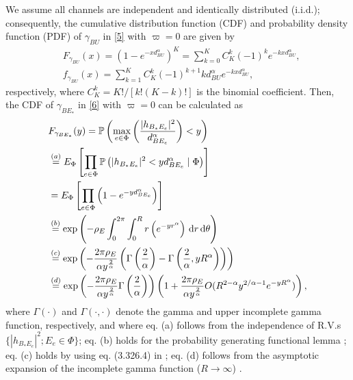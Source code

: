 \documentclass[10pt]{IEEEtran}
\newcommand{\rmd}{\,{\rm d}}
\begin{document}
We assume all channels are independent and identically distributed (i.i.d.); consequently, the cumulative distribution function (CDF) and probability density function (PDF) of $\gamma_{BU}$ in \eqref{5} with $\varpi = 0$ are given by
\begin{equation}\label{8}
\begin{split}
&F_{\gamma_{BU}}(x) = \left(1-e^{-xd^\alpha_{BU}}\right)^K = \sum^K_{k=0}C^k_K(-1)^ke^{-kxd^\alpha_{BU}},\\
&f_{\gamma_{BU}}(x) = \sum_{k=1}^KC^k_K(-1)^{k+1}kd^\alpha_{BU} e^{-kxd^\alpha_{BU}},
\end{split}
\end{equation}
respectively, where $C^{k}_{K}=K!/[k!(K-k)!]$ is the binomial coefficient. Then, the CDF of $\gamma_{BE_*}$ in \eqref{6} with $\varpi = 0$ can be calculated as
\begin{equation} \label{9}
\begin{split}
&F_{\gamma_{BE_*}}(y) = \mathbb{P}\left(\underset{e\in \Phi}{\max}\left(\frac{|h_{B_*E_e}|^2}{d^\alpha_{BE_e}}\right)<y\right)\\
& \overset{(a)}{=}  E_\Phi\left[\prod_{e\in \Phi}\mathbb{P}\left(|h_{B_*E_e}|^2<yd^{\alpha}_{BE_e}\mid \Phi\right)\right]\\
& =  E_\Phi\left[\prod_{e\in \Phi}\left(1-e^{-yd^{\alpha}_{BE_e}}\right)\right]\\
& \overset{(b)}{=} \textrm{exp}\left(-\rho_{E}\int^{2\pi}_0\int^{R}_0r\left(e^{-yr^{\alpha}}\right)\rmd r\rmd \theta\right)\\
& \overset{(c)}{=} \textrm{exp}\left(-\frac{2\pi\rho_E}{\alpha y^{\frac{2}{\alpha}}}\left(\Gamma\left(\frac{2}{\alpha}\right)-\Gamma\left(\frac{2}{\alpha}, yR^\alpha\right)\right)\right)\\
& \overset{(d)}{=} \textrm{exp}\left(-\frac{2\pi\rho_E}{\alpha y^{\frac{2}{\alpha}}}\Gamma\left(\frac{2}{\alpha}\right)\right)\left(1+\frac{2\pi\rho_E}{\alpha y^{\frac{2}{\alpha}}}O(R^{2-\alpha}y^{2/\alpha-1}e^{-yR^\alpha})\right),
\end{split}
\end{equation}
where $\Gamma(\cdot)$ and $\Gamma(\cdot,\cdot)$ denote the gamma and upper incomplete gamma function, respectively, and where eq. (a) follows from the independence of R.V.s $\{|h_{B_*E_e}|^2; E_e\in\Phi\}$; eq. (b) holds for the probability generating functional lemma \cite{M.H12}; eq. (c) holds by using eq. (3.326.4) in \cite{I.S07}; eq. (d) follows from the asymptotic expansion of the incomplete gamma function ($R\to\infty$) \cite{M.A72}.
\end{document}

